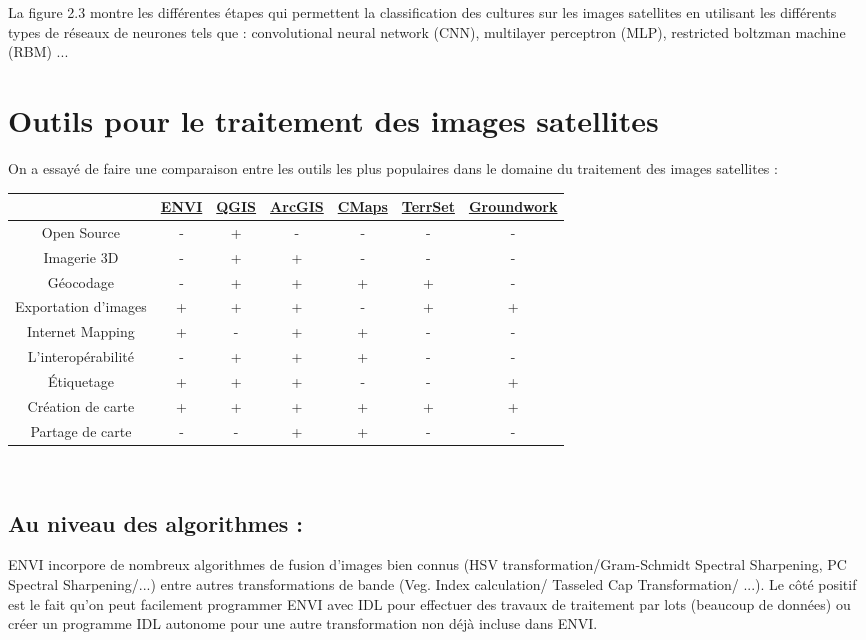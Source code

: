 \documentclass[12pt, openany]{report}
\begin{document}
La figure 2.3 montre les différentes étapes qui permettent la classification des cultures sur les images satellites en utilisant les différents types de réseaux de neurones tels que  : convolutional neural network (CNN), multilayer perceptron (MLP), restricted boltzman machine (RBM) ...

\section{Outils pour le traitement des images satellites}

On a essayé de faire une comparaison entre les outils les plus populaires dans le domaine du traitement des images satellites :

{\setlength{\tabulinesep}{3pt}
\begin{tabu}{|c|c|c|c|c|c|c|}
\hline
{}&\href{https://www.harrisgeospatial.com/Software-Technology/ENVI}{ENVI}&\href{https://qgis.org/fr/site/}{QGIS}&\href{https://www.arcgis.com/index.html}{ArcGIS}&\href{https://cmapsconnect.com/}{CMaps}&\href{https://clarklabs.org/terrset/}{TerrSet}&\href{https://groundwork.azavea.com/}{Groundwork}\\
\hline
Open Source & - & + & - & - & - & -\\
\hline
Imagerie 3D & - & + & + & - & - & -\\
\hline
Géocodage & - & + & + & + & + & -\\
\hline
Exportation d'images & + & + & + & - & + & +\\
\hline
Internet Mapping & + & - & + & + & - & -\\
\hline
L'interopérabilité & - & + & + & + & - & -\\
\hline
Étiquetage & + & + & + & - & - & +\\
\hline
Création de carte & + & + & + & + & + & +\\
\hline
Partage de carte & - & - & + & + & - & -\\
\hline
\end{tabu}}\\


\subsection{Au niveau des algorithmes :}


ENVI incorpore de nombreux algorithmes de fusion d'images bien connus (HSV transformation/Gram-Schmidt Spectral Sharpening, PC Spectral Sharpening/...) entre autres transformations de bande (Veg. Index calculation/ Tasseled Cap Transformation/ ...). Le côté positif est le fait qu'on peut facilement programmer ENVI avec IDL pour effectuer des travaux de traitement par lots (beaucoup de données) ou créer un programme IDL autonome pour une autre transformation non déjà incluse dans ENVI.\cite{re12}
\end{document}
